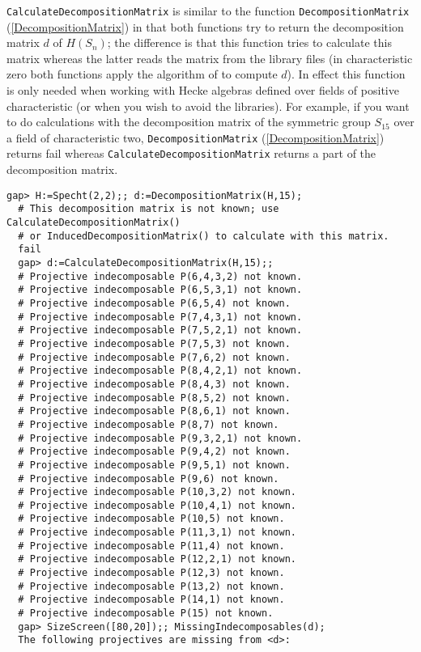 \documentclass[a4paper,11pt]{report}
\begin{document}
{{{ \texttt{CalculateDecompositionMatrix} is similar to the function \texttt{DecompositionMatrix} (\ref{DecompositionMatrix}) in that both functions try to return the decomposition matrix $d$ of $H(S_n)$; the difference is that this function tries to calculate this matrix whereas
the latter reads the matrix from the library files (in characteristic zero
both functions apply the algorithm of \cite{LLT} to compute $d$). In effect this function is only needed when working with Hecke algebras
defined over fields of positive characteristic (or when you wish to avoid the
libraries). For example, if you want to do calculations with the decomposition
matrix of the symmetric group $S_{15}$ over a field of characteristic two, \texttt{DecompositionMatrix} (\ref{DecompositionMatrix}) returns fail whereas \texttt{CalculateDecompositionMatrix} returns a part of the decomposition matrix. 
\begin{Verbatim}[fontsize=\small,frame=single,label=Example]
  gap> H:=Specht(2,2);; d:=DecompositionMatrix(H,15);
  # This decomposition matrix is not known; use CalculateDecompositionMatrix()
  # or InducedDecompositionMatrix() to calculate with this matrix.
  fail
  gap> d:=CalculateDecompositionMatrix(H,15);;
  # Projective indecomposable P(6,4,3,2) not known.
  # Projective indecomposable P(6,5,3,1) not known.
  # Projective indecomposable P(6,5,4) not known.
  # Projective indecomposable P(7,4,3,1) not known.
  # Projective indecomposable P(7,5,2,1) not known.
  # Projective indecomposable P(7,5,3) not known.
  # Projective indecomposable P(7,6,2) not known.
  # Projective indecomposable P(8,4,2,1) not known.
  # Projective indecomposable P(8,4,3) not known.
  # Projective indecomposable P(8,5,2) not known.
  # Projective indecomposable P(8,6,1) not known.
  # Projective indecomposable P(8,7) not known.
  # Projective indecomposable P(9,3,2,1) not known.
  # Projective indecomposable P(9,4,2) not known.
  # Projective indecomposable P(9,5,1) not known.
  # Projective indecomposable P(9,6) not known.
  # Projective indecomposable P(10,3,2) not known.
  # Projective indecomposable P(10,4,1) not known.
  # Projective indecomposable P(10,5) not known.
  # Projective indecomposable P(11,3,1) not known.
  # Projective indecomposable P(11,4) not known.
  # Projective indecomposable P(12,2,1) not known.
  # Projective indecomposable P(12,3) not known.
  # Projective indecomposable P(13,2) not known.
  # Projective indecomposable P(14,1) not known.
  # Projective indecomposable P(15) not known.
  gap> SizeScreen([80,20]);; MissingIndecomposables(d);
  The following projectives are missing from <d>:

\end{Verbatim}}}}
\end{document}
